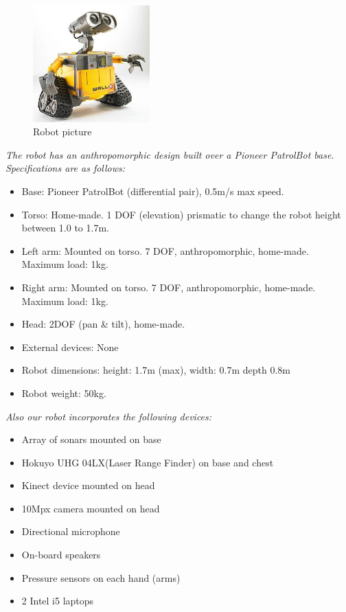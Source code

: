 \documentclass[runningheads,a4paper]{llncs}
\begin{document}
\begin{figure}
	\vspace*{-1cm}
	\centering
	\includegraphics[width=0.4\textwidth]{images/robot.jpg}
	\caption{Robot picture}
	\label{fig:virbot}
\end{figure}
\textit{The robot has an anthropomorphic design built over a Pioneer PatrolBot base. Specifications are as follows:}
\begin{itemize}
	\item Base: Pioneer PatrolBot (differential pair), 0.5m/s max speed.
	\item Torso: Home-made. 1 DOF (elevation) prismatic to change the robot height between 1.0 to 1.7m.
	\item Left arm: Mounted on torso. 7 DOF, anthropomorphic, home-made. Maximum load: 1kg.
	\item Right arm: Mounted on torso. 7 DOF, anthropomorphic, home-made. Maximum load: 1kg.
	\item Head: 2DOF (pan \& tilt), home-made.
	\item External devices: None
	\item Robot dimensions: height: 1.7m (max), width: 0.7m depth 0.8m
	\item Robot weight: 50kg.
\end{itemize}

\textit{Also our robot incorporates the following devices:}

\begin{itemize}
	\item Array of sonars mounted on base
	\item Hokuyo UHG 04LX(Laser Range Finder) on base and chest
	\item Kinect device mounted on head
	\item 10Mpx camera mounted on head
	\item Directional microphone
	\item On-board speakers
	\item Pressure sensors on each hand (arms)
	\item 2 Intel i5 laptops
\end{itemize}
\end{document}

